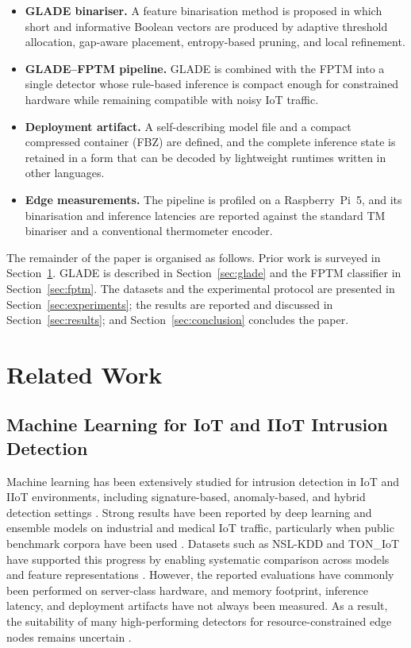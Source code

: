 \documentclass[journal,twoside,web]{ieeecolor}
\begin{document}
\begin{itemize}
    \item \textbf{GLADE binariser.} A feature binarisation method is proposed in which short and informative Boolean vectors are produced by adaptive threshold allocation, gap-aware placement, entropy-based pruning, and local refinement.

    \item \textbf{GLADE--FPTM pipeline.} GLADE is combined with the FPTM into a single detector whose rule-based inference is compact enough for constrained hardware while remaining compatible with noisy IoT traffic.

    \item \textbf{Deployment artifact.} A self-describing model file and a compact compressed container (FBZ) are defined, and the complete inference state is retained in a form that can be decoded by lightweight runtimes written in other languages.

    \item \textbf{Edge measurements.} The pipeline is profiled on a Raspberry~Pi~5, and its binarisation and inference latencies are reported against the standard TM binariser and a conventional thermometer encoder.
\end{itemize}

The remainder of the paper is organised as follows. Prior work is surveyed in Section~\ref{sec:related}. GLADE is described in Section~\ref{sec:glade} and the FPTM classifier in Section~\ref{sec:fptm}. The datasets and the experimental protocol are presented in Section~\ref{sec:experiments}; the results are reported and discussed in Section~\ref{sec:results}; and Section~\ref{sec:conclusion} concludes the paper.


\section{Related Work}
\label{sec:related}

\subsection{Machine Learning for IoT and IIoT Intrusion Detection}

Machine learning has been extensively studied for intrusion detection in IoT and IIoT environments, including signature-based, anomaly-based, and hybrid detection settings \cite{hussain2020ml, algaradi2020survey}. Strong results have been reported by deep learning and ensemble models on industrial and medical IoT traffic, particularly when public benchmark corpora have been used \cite{wang2023lightweight, jouhari2024lightweight, hady2020wustl}. Datasets such as NSL-KDD and TON\_IoT have supported this progress by enabling systematic comparison across models and feature representations \cite{tavallaee2009nslkdd, moustafa2021toniot}. However, the reported evaluations have commonly been performed on server-class hardware, and memory footprint, inference latency, and deployment artifacts have not always been measured. As a result, the suitability of many high-performing detectors for resource-constrained edge nodes remains uncertain \cite{hussain2020ml, algaradi2020survey}.
\end{document}
